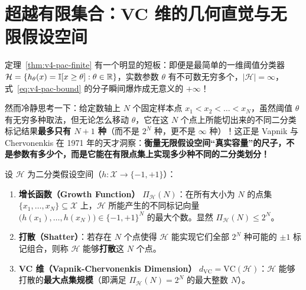 \section{超越有限集合：VC 维的几何直觉与无限假设空间}

定理~\ref{thm:v4-pac-finite} 有一个明显的短板：即便是最简单的一维阈值分类器 $\mathcal{H} = \{h_\theta(x) = \mathbb{I}[x \ge \theta] : \theta \in \mathbb{R}\}$，实数参数 $\theta$ 有不可数无穷多个，$|\mathcal{H}| = \infty$，式~\eqref{eq:v4-pac-bound} 的分子瞬间爆炸成无意义的 $+\infty$！

然而冷静思考一下：给定数轴上 $N$ 个固定样本点 $x_1 < x_2 < \dots < x_N$，虽然阈值 $\theta$ 有无穷多种取法，但无论怎么移动 $\theta$，它在这 $N$ 个点上所能切出来的不同二分类标记结果\textbf{最多只有 $N + 1$ 种}（而不是 $2^N$ 种，更不是 $\infty$ 种）！这正是 Vapnik 与 Chervonenkis 在 1971 年的天才洞察：\textbf{衡量无限假设空间“真实容量”的尺子，不是参数有多少个，而是它能在有限点集上实现多少种不同的二分类划分！}

\begin{defBox}
\begin{definition}\label{def:v4-vc}
设 $\mathcal{H}$ 为二分类假设空间（$h: \mathcal{X} \to \{-1, +1\}$）：
\begin{enumerate}
  \item \textbf{增长函数（Growth Function）} $\Pi_{\mathcal{H}}(N)$：在所有大小为 $N$ 的点集 $\{x_1, \dots, x_N\} \subseteq \mathcal{X}$ 上，$\mathcal{H}$ 所能产生的不同标记向量 $\big(h(x_1), \dots, h(x_N)\big) \in \{-1, +1\}^N$ 的最大个数。显然 $\Pi_{\mathcal{H}}(N) \le 2^N$。
  \item \textbf{打散（Shatter）}：若存在 $N$ 个点使得 $\mathcal{H}$ 能实现它们全部 $2^N$ 种可能的 $\pm 1$ 标记组合，则称 $\mathcal{H}$ 能够\textbf{打散}这 $N$ 个点。
  \item \textbf{VC 维（Vapnik-Chervonenkis Dimension）} $d_{\mathrm{VC}} = \mathrm{VC}(\mathcal{H})$：$\mathcal{H}$ 能够打散的\textbf{最大点集规模}（即满足 $\Pi_{\mathcal{H}}(N) = 2^N$ 的最大整数 $N$）。
\end{enumerate}
\end{definition}
\end{defBox}

